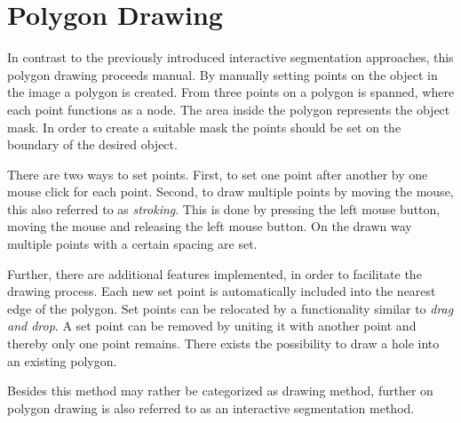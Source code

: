 
\section{Polygon Drawing}\label{ord:ch3:sec1}

In contrast to the previously introduced interactive segmentation approaches, this polygon drawing proceeds manual.
By manually setting points on the object in the image a polygon is created.
From three points on a polygon is spanned, where each point functions as a node.
The area inside the polygon represents the object mask.
In order to create a suitable mask the points should be set on the boundary of the desired object.

There are two ways to set points.
First, to set one point after another by one mouse click for each point.
Second, to draw multiple points by moving the mouse, this also referred to as \textit{stroking}.
This is done by pressing the left mouse button, moving the mouse and releasing the left mouse button.
On the drawn way multiple points with a certain spacing are set.

Further, there are additional features implemented, in order to facilitate the drawing process.
Each new set point is automatically included into the nearest edge of the polygon.
Set points can be relocated by a functionality similar to \textit{drag and drop}.
A set point can be removed by uniting it with another point and thereby only one point remains.
There exists the possibility to draw a hole into an existing polygon.

Besides this method may rather be categorized as drawing method, further on polygon drawing is also referred to as an interactive segmentation method.
